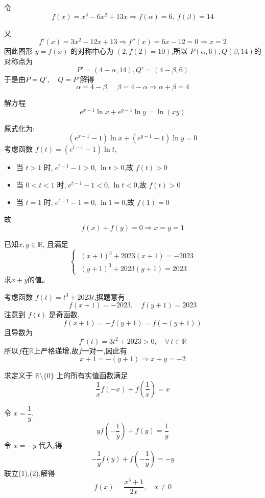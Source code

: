 \begin{questions}
    \begin{solution}
        令 $$f(x) = x^3 - 6x^2 + 13x \Rightarrow f(\alpha) = 6,\ f(\beta) = 14$$

        又 $$f'(x) = 3x^2 - 12x + 13 \Rightarrow f''(x) = 6x - 12 = 0 \Rightarrow x = 2$$
        因此图形 $y = f(x)$ 的对称中心为 $(2, f(2) = 10)$,所以 $P(\alpha, 6), Q(\beta, 14)$的对称点为
        \[
        P' = (4 - \alpha, 14), Q' = (4 - \beta, 6)
        \]
        于是由$P = Q' ,\quad Q = P'$解得
        \[
        \alpha = 4 - \beta,\quad \beta = 4 - \alpha \Rightarrow \alpha + \beta = 4
        \]
    \end{solution}

    \question 解方程
    \[
    e^{x-1} \ln x + e^{y-1} \ln y = \ln(xy)
    \]
    \begin{solution}
        原式化为:
        \[
        (e^{x-1} - 1)\ln x + (e^{y-1} - 1)\ln y = 0
        \]
        考虑函数 \(f(t) = (e^{t-1} - 1)\ln t\),
        \begin{itemize}
        \item 当 \(t > 1\) 时,\(\;e^{t-1} - 1 > 0\),\(\;\ln t > 0\),故 \(f(t) > 0\)
        \item 当 \(0 < t < 1\) 时,\(\;e^{t-1} - 1 < 0\),\(\;\ln t < 0\),故 \(f(t) > 0\)
        \item 当 \(t = 1\) 时,\(\;e^{t-1} - 1 = 0\),\(\;\ln 1 = 0\),故 \(f(1) = 0\)
        \end{itemize}
        故 $$f(x) + f(y) = 0 \Rightarrow x = y = 1$$
    \end{solution}

    \question 已知$x,y \in \mathbb{R}$, 且满足
    \[
    \begin{cases}
    \;(x+1)^{3}+2023(x+1)=-2023 \\
    \;(y+1)^{3}+2023(y+1)=2023
    \end{cases}
    \]
    求$x+y$的值。
    \begin{solution}
    考虑函数 \( f(t) = t^3 + 2023t \),据题意有
        \[
        f(x+1) = -2023, \quad f(y+1) = 2023
        \]
        注意到 \( f(t) \) 是奇函数,
        \[
        f(x+1) = -f(y+1)= f(-(y+1))
        \]
        且导数为
        \[
        f'(t) = 3t^2 + 2023 > 0, \quad \forall\, t \in \mathbb{R}
        \]
        所以$f$在$\mathbb{R}$上严格递增,故$f$一对一,因此有
        \[
        x+1 = -(y+1) \Rightarrow x + y = -2
        \]
    \end{solution}

    \question 求定义于 $\mathbb{R} \setminus \{0\}$ 上的所有实值函数满足 
    \[
    \frac{1}{x} f(-x) + f\left( \frac{1}{x} \right) = x
    \]
    \begin{solution}
        令 $x = \dfrac{1}{y}$,
        \[
        y f\left( -\frac{1}{y} \right) + f(y) = \frac{1}{y} \tag{1}
        \]
        令 $x = -y$ 代入,得 
        \[
        -\frac{1}{y} f(y) + f\left( -\frac{1}{y} \right) = -y \tag{2}
        \]
        联立(1),(2),解得
        \[
        f(x) = \frac{x^3 + 1}{2x}, \quad x \neq 0
        \]
    \end{solution}


\end{questions}
